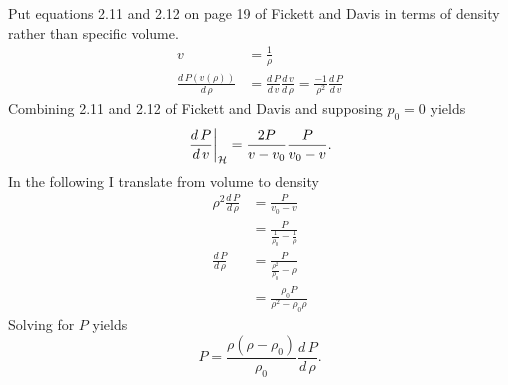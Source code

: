 \documentclass[]{article}
\begin{document}
Put equations 2.11 and 2.12 on page 19 of Fickett and Davis in terms
of density rather than specific volume.
\begin{align*}
  v &= \frac{1}{\rho} \\
  \frac{d\, P(v(\rho))}{d\,\rho} &= \frac{d\, P}{d\, v} \frac{d\,
    v}{d\, \rho} = \frac{-1}{\rho^2} \frac{d\, P}{d\, v}
\end{align*}
Combining 2.11 and 2.12 of Fickett and Davis and supposing $p_0 = 0$
yields
\begin{equation*}
  \left. \frac{d\, P}{d\, v} \right|_{\cal H} = \frac{2P}{v-v_0}
  \frac{P}{v_0-v}.
\end{equation*}
In the following I translate from volume to density
\begin{align*}
  \rho^2 \frac{d\, P}{d\, \rho} &= \frac{P}{v_0-v} \\
  &= \frac{P}{\frac{1}{\rho_0}-\frac{1}{\rho}} \\
  \frac{d\, P}{d\, \rho} &= \frac{P}{\frac{\rho^2}{\rho_0}-\rho} \\
  &= \frac{\rho_0 P}{\rho^2 - \rho_0\rho}
\end{align*}
Solving for $P$ yields
\begin{equation*}
  P = \frac{\rho(\rho - \rho_0) }{\rho_0}\frac{d\, P}{d\, \rho}.
\end{equation*}
\end{document}
